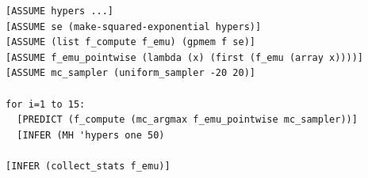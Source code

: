 \documentclass{article} %
\newcommand{\argmax}[1]{\underset{#1}{\operatorname{arg}\,\operatorname{max}}\;}
\newcommand{\gpmem}{\texttt{gpmem}}
\begin{document}
\begin{lstlisting}[frame=single,caption={
  Code for Bayesian optimization using \gpmem.
  The procedure \texttt{f\_compute} computes \texttt{f} directly, thus improving the GP model \texttt{f\_emu}.
  (\texttt{f\_emu\_pointwise} is simply a shortcut for sampling the GP model at a single point; \texttt{f\_emu} is more general, allowing joint samples to be taken at any set of points.)
  In the loop, \texttt{f\_compute} is called to compute the value of \texttt{f} at a new argument.
  The new argument, \texttt{(mc\_argmax f\_emu\_pointwise}, is a Monte Carlo estimate of the maximum pointwise sample of \texttt{f\_emu} (itself a stochastic quantity), with the Monte Carlo samples being drawn in this case uniformly between $-20$ and $20$.
  After each new call to \texttt{f\_compute}, the Metropolis--Hastings algorithm is used to perform inference on the hyperparameters of the covariance function in the GP model in light of the new conditioning data.
  Once enough calls to \texttt{f\_compute} have been made (in our case we stopped at 15 calls), we can inspect the full list of probed $(x,y)$ pairs with \texttt{extract\_stats}.
  The answer to our maximization problem is simply the maximum $y$; but our algorithm also learns more potentiall useful information.
},mathescape,label=alg:bayesopt]
[ASSUME hypers ...]
[ASSUME se (make-squared-exponential hypers)]
[ASSUME (list f_compute f_emu) (gpmem f se)]
[ASSUME f_emu_pointwise (lambda (x) (first (f_emu (array x))))]
[ASSUME mc_sampler (uniform_sampler -20 20)]

for i=1 to 15:
  [PREDICT (f_compute (mc_argmax f_emu_pointwise mc_sampler))]
  [INFER (MH 'hypers one 50)

[INFER (collect_stats f_emu)]
\end{lstlisting}
\end{document}
